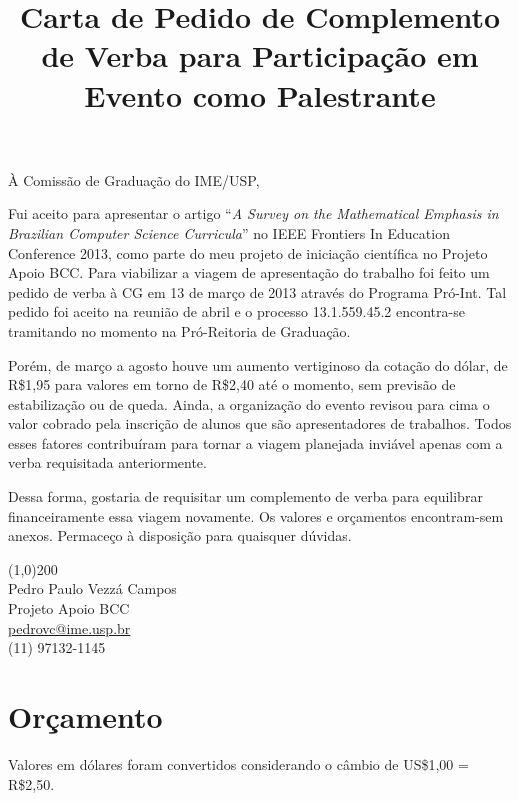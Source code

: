 \documentclass[brazil]{article}
\newcommand{\usd}{US\$}
\newcommand{\brl}{R\$}
\begin{document}
\title{Carta de Pedido de Complemento de Verba para Participação em Evento como Palestrante}

\maketitle

\begin{flushleft}
À Comissão de Graduação do IME/USP,
\end{flushleft}


Fui aceito para apresentar o artigo ``\emph{A Survey on the Mathematical Emphasis in Brazilian Computer Science Curricula}'' no IEEE Frontiers In Education Conference 2013, como parte do meu projeto de iniciação científica no Projeto Apoio BCC. Para viabilizar a viagem de apresentação do trabalho foi feito um pedido de verba à CG em 13 de março de 2013 através do Programa Pró-Int. Tal pedido foi aceito na reunião de abril e o processo 13.1.559.45.2 encontra-se tramitando no momento na Pró-Reitoria de Graduação.

Porém, de março a agosto houve um aumento vertiginoso da cotação do dólar, de \brl1,95 para valores em torno de \brl2,40 até o momento, sem previsão de estabilização ou de queda. Ainda, a organização do evento revisou para cima o valor cobrado pela inscrição de alunos que são apresentadores de trabalhos. Todos esses fatores contribuíram para tornar a viagem planejada inviável apenas com a verba requisitada anteriormente.

Dessa forma, gostaria de requisitar um complemento de verba para equilibrar financeiramente essa viagem novamente. Os valores e orçamentos encontram-sem anexos. Permaceço à disposição para quaisquer dúvidas.


\vfill

\begin{flushright}
\line(1,0){200}\\
Pedro Paulo Vezzá Campos\\
Projeto Apoio BCC\\
\url{pedrovc@ime.usp.br}\\
(11) 97132-1145
\end{flushright}

\newpage 

\section{Orçamento}
Valores em dólares foram convertidos considerando o câmbio de \usd1,00 = \brl2,50.
\end{document}
